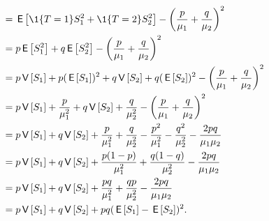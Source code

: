\begin{extra}
\begin{solution}
\begin{align*}
&= \E{\1{T=1} S_1^2 + \1{T=2} S_2^2} - \left(\frac{p}{\mu_1}+\frac{q}{\mu_2}\right)^2 \\ 
&= p \E{S_1^2} + q \E{S_2^2} - \left(\frac{p}{\mu_1}+\frac{q}{\mu_2}\right)^2 \\ 
&= p \V{S_1} + p (\E{S_1})^2 + q \V{S_2} + q(\E{ S_2})^2 - \left(\frac{p}{\mu_1}+\frac{q}{\mu_2}\right)^2 \\ 
&= p \V{S_1} + \frac{p}{\mu_1^2} + q \V{S_2} + \frac{q}{\mu_2^2} - \left(\frac{p}{\mu_1}+\frac{q}{\mu_2}\right)^2 \\ 
&= p \V{S_1} + q \V{S_2}
+ \frac{p}{\mu_1^2} + \frac{q}{\mu_2^2}
- \frac{p^2}{\mu_1^2}-\frac{q^2}{\mu_2^2} -\frac{2pq}{\mu_1\mu_2}\\ 
&= p \V{S_1} + q \V{S_2}
+ \frac{p(1-p)}{\mu_1^2} + \frac{q(1-q)}{\mu_2^2}
-\frac{2pq}{\mu_1\mu_2}\\ 
&= p \V{S_1} + q \V{S_2}
+ \frac{pq}{\mu_1^2} + \frac{qp}{\mu_2^2}
-\frac{2pq}{\mu_1\mu_2}\\ 
&= p \V{S_1} + q \V{S_2}
+ pq(\E{S_1} - \E{S_2})^2.
\end{align*}
\end{solution}
\end{extra}








